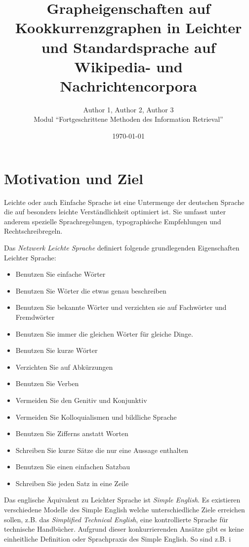 \documentclass[12pt, a4paper]{article}
\title{Grapheigenschaften auf Kookkurrenzgraphen in Leichter und Standardsprache auf Wikipedia- und Nachrichtencorpora}
\author{Author 1, Author 2, Author 3\\Modul "`Fortgeschrittene Methoden des Information Retrieval"'}
\date{\today}
\begin{document}
\maketitle
\tableofcontents

\section{Motivation und Ziel}

Leichte oder auch Einfache Sprache ist eine Untermenge der deutschen Sprache
die auf besonders leichte Verst\"andlichkeit optimiert ist. Sie umfasst unter
anderem spezielle Sprachregelungen, typographische Empfehlungen und
Rechtschreibregeln. 

Das \emph{Netzwerk Leichte Sprache} definiert folgende grundlegenden
Eigenschaften Leichter Sprache:

\begin{itemize}
	\item Benutzen Sie einfache W\"orter
	\item Benutzen Sie W\"orter die etwas genau beschreiben
	\item Benutzen Sie bekannte W\"orter und verzichten sie auf Fachw\"orter und Fremdw\"orter
	\item Benutzen Sie immer die gleichen W\"orter f\"ur gleiche Dinge.
	\item Benutzen Sie kurze W\"orter
	\item Verzichten Sie auf Abk\"urzungen
	\item Benutzen Sie Verben
	\item Vermeiden Sie den Genitiv und Konjunktiv
	\item Vermeiden Sie Kolloquialismen und bildliche Sprache
	\item Benutzen Sie Zifferns anstatt Worten
	\item Schreiben Sie kurze S\"atze die nur eine Aussage enthalten
	\item Benutzen Sie einen einfachen Satzbau
	\item Schreiben Sie jeden Satz in eine Zeile
\end{itemize}

Das englische \"Aquivalent zu Leichter Sprache ist \emph{Simple English}. Es
existieren verschiedene Modelle des Simple English welche unterschiedliche
Ziele erreichen sollen, z.B. das \emph{Simplified Technical English}, eine
kontrollierte Sprache f\"ur technische Handb\"ucher. Aufgrund dieser
konkurrierenden Ans\"atze gibt es keine einheitliche Definition oder
Sprachpraxis des Simple English. So sind z.B. i
\end{document}
